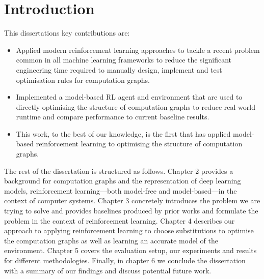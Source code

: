 \chapter{Introduction}

This dissertations key contributions are:

\begin{itemize}
  \item Applied modern reinforcement learning approaches to tackle a recent problem common in all machine learning frameworks to reduce the significant engineering time required to manually design, implement and test optimisation rules for computation graphs.
  \item Implemented a model-based RL agent and environment that are used to directly optimising the structure of computation graphs to reduce real-world runtime and compare performance to current baseline results.
  \item This work, to the best of our knowledge, is the first that has applied model-based reinforcement learning to optimising the structure of computation graphs.
\end{itemize}

The rest of the dissertation is structured as follows. Chapter 2 provides a background for computation graphs and the representation of deep learning models, reinforcement learning---both model-free and model-based---in the context of computer systems. Chapter 3 concretely introduces the problem we are trying to solve and provides baselines produced by prior works and formulate the problem in the context of reinforcement learning. Chapter 4 describes our approach to applying reinforcement learning to choose substitutions to optimise the computation graphs as well as learning an accurate model of the environment. Chapter 5 covers the evaluation setup, our experiments and results for different methodologies. Finally, in chapter 6 we conclude the dissertation with a summary of our findings and discuss potential future work.